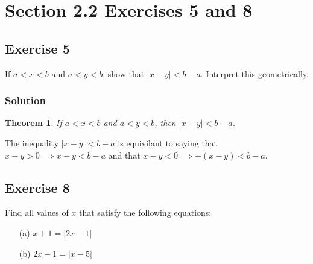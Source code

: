 \documentclass[12pt]{article}
\newtheorem*{thm}{Theorem}
\begin{document}
\section*{Section 2.2 Exercises 5 and 8}

\subsection*{Exercise 5}
If $a < x < b$ and $a < y < b$, show that $\left|x - y\right| < b - a$. Interpret this geometrically.

\subsubsection*{Solution}
\begin{thm}
If $a < x < b$ and $a < y < b$, then $\left| x - y \right| < b - a$.
\end{thm}

The inequality $\left| x - y \right| < b - a$ is equivilant to saying that $x - y > 0 \implies x - y < b - a$ and that $x - y < 0 \implies -\left(x - y\right) < b - a$.

\subsection*{Exercise 8}
Find all values of $x$ that satisfy the following equations:
\begin{itemize}
\item[(a)] $x + 1 = \left|2x - 1\right|$
\item[(b)] $2x - 1 = \left|x - 5\right|$
\end{itemize}
\end{document}
